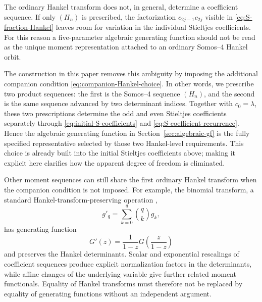 \documentclass[11pt]{article}
\theoremstyle{remark}
\begin{document}
The ordinary Hankel transform does not, in general, determine a coefficient
sequence.  If only $(H_n)$ is prescribed, the factorization
$c_{2j-1}c_{2j}$ visible in \eqref{eq:S-fraction-Hankel} leaves room for
variation in the individual Stieltjes coefficients.  For this reason a
five-parameter algebraic generating function should not be read as the unique
moment representation attached to an ordinary Somos--4 Hankel orbit.

The construction in this paper removes this ambiguity by imposing the
additional companion condition \eqref{eq:companion-Hankel-choice}.  In other
words, we prescribe two product sequences: the first is the Somos--4 sequence
$(H_n)$, and the second is the same sequence advanced by two determinant
indices.  Together with $c_0=\lambda$, these two prescriptions determine the
odd and even Stieltjes coefficients separately through
\eqref{eq:initial-S-coefficients} and \eqref{eq:S-coefficient-recurrence}.
Hence the algebraic generating function in Section~\ref{sec:algebraic-gf} is
the fully specified representative selected by those two Hankel-level
requirements.  This choice is already built into the initial Stieltjes
coefficients above; making it explicit here clarifies how the apparent degree
of freedom is eliminated.

Other moment sequences can still share the first ordinary Hankel transform
when the companion condition is not imposed.  For example, the binomial
transform, a standard Hankel-transform-preserving operation
\cite{Layman2001,French2007},
\begin{equation}
 g'_q=\sum_{k=0}^{q}\binom{q}{k}g_k,
 \label{eq:binomial-transform}
\end{equation}
has generating function
\[
 G'(z)=\frac{1}{1-z}G\!\left(\frac{z}{1-z}\right)
\]
and preserves the Hankel determinants.  Scalar and exponential rescalings of
coefficient sequences produce explicit normalization factors in the
determinants, while affine changes of the underlying variable give further
related moment functionals.  Equality of Hankel transforms must therefore not
be replaced by equality of generating functions without an independent
argument.
\end{document}
